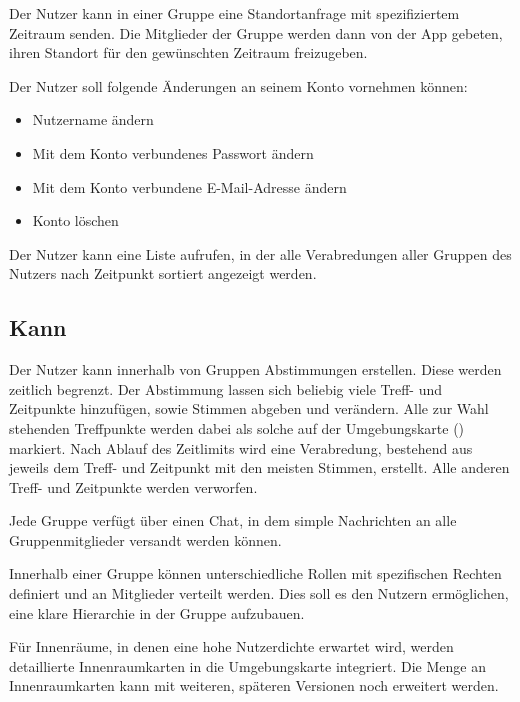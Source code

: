\documentclass[parskip=full,11pt]{scrartcl}
\begin{document}
%
Der Nutzer kann in einer Gruppe eine Standortanfrage mit spezifiziertem
Zeitraum senden.
Die Mitglieder der Gruppe werden dann von der App gebeten,
ihren Standort für den gewünschten Zeitraum freizugeben.

%
Der Nutzer soll folgende Änderungen an seinem Konto vornehmen können:
\begin{itemize}
		\item Nutzername ändern
    \item Mit dem Konto verbundenes Passwort ändern
    \item Mit dem Konto verbundene E-Mail-Adresse ändern
    \item Konto löschen
\end{itemize}

%
%
Der Nutzer kann eine Liste aufrufen, in der alle Verabredungen aller Gruppen
des Nutzers nach Zeitpunkt sortiert angezeigt werden.

\subsection{Kann}

%
Der Nutzer kann innerhalb von Gruppen Abstimmungen erstellen.
Diese werden zeitlich begrenzt.
Der Abstimmung lassen sich beliebig viele Treff- und Zeitpunkte hinzufügen,
sowie Stimmen abgeben und verändern.
Alle zur Wahl stehenden Treffpunkte werden dabei als solche auf der
Umgebungskarte () markiert.
Nach Ablauf des Zeitlimits wird eine Verabredung, bestehend aus jeweils dem
Treff- und Zeitpunkt mit den meisten Stimmen, erstellt.
Alle anderen Treff- und Zeitpunkte werden verworfen.

%
Jede Gruppe verfügt über einen Chat, in dem simple Nachrichten an alle
Gruppenmitglieder versandt werden können.

Innerhalb einer Gruppe können unterschiedliche Rollen
mit spezifischen Rechten definiert und an Mitglieder verteilt werden.
Dies soll es den Nutzern ermöglichen,
eine klare Hierarchie in der Gruppe aufzubauen.

%
Für Innenräume, in denen eine hohe Nutzerdichte erwartet wird, werden
detaillierte Innenraumkarten in die Umgebungskarte integriert. Die Menge an
Innenraumkarten kann mit weiteren, späteren Versionen noch erweitert werden.
\end{document}

